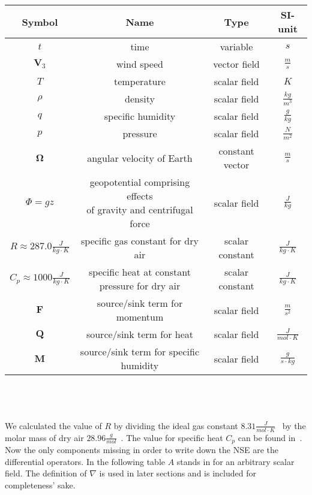 \begin{tabular}{c|c|c|c}
\hline
Symbol & Name & Type & SI-unit \\ 
\hline 
$t$ & time & variable & $s$ \\
\hline 
$\textbf{V}_3$ & wind speed & vector field & $\frac{m}{s}$ \\
\hline 
$T$ & temperature & scalar field & $K$ \\
\hline 
$\rho$ & density & scalar field & $\frac{kg}{m^3}$ \\
\hline 
$q$ & specific humidity & scalar field & $\frac{g}{kg}$ \\
\hline 
$p$ & pressure & scalar field & $\frac{N}{m^2}$ \\
\hline 
$\boldsymbol{\Omega}$ & angular velocity of Earth & constant vector & $\frac{m}{s}$ \\
\hline 
$\Phi = gz$ & \makecell{geopotential comprising effects\\ of gravity and centrifugal force} & scalar field & $\frac{J}{kg}$ \\
\hline 
$R \approx 287.0 \frac{J}{kg\cdot K}$ & specific gas constant for dry air & scalar constant & $\frac{J}{kg\cdot K}$ \\ 
\hline 
$C_p \approx 1000 \frac{J}{kg\cdot K}$ & \makecell{specific heat at constant \\pressure for dry air} & scalar constant & $\frac{J}{kg\cdot K}$ \\ 
\hline 
$\textbf{F}$ & source/sink term for momentum & scalar field & $\frac{m}{s^2}$ \\ 
\hline 
$\textbf{Q}$ & source/sink term for heat & scalar field & $\frac{J}{mol\cdot K}$ \\ 
\hline 
$\textbf{M}$ & source/sink term for specific humidity & scalar field & $\frac{g}{s\cdot kg}$ \\ 
\end{tabular}
\\\\\\
We calculated the value of $R$ by dividing the ideal gas constant $8.31\frac{J}{mol\cdot K}$~\cite{mohr2008codata} by the molar mass of dry air $28.96\frac{g}{mol}$~\cite{langeheinecke1993thermodynamik}.
The value for specific heat $C_p$ can be found in~\cite{beckett1955tables}.
\newpage\noindent
Now the only components missing in order to write down the NSE are the differential operators.
In the following table $A$ stands in for an arbitrary scalar field.
The definition of $\nabla$ is used in later sections and is included for completeness' sake.

